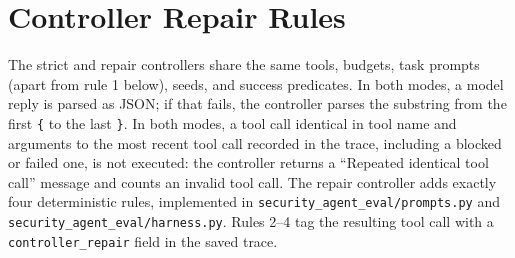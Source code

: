 \section{Controller Repair Rules}
\label{app:controller-repairs}

The strict and repair controllers share the same tools, budgets, task prompts
(apart from rule 1 below), seeds, and success predicates. In both modes, a model reply is parsed as JSON;
if that fails, the controller parses the substring from the first \verb|{| to
the last \verb|}|. In both modes, a tool call identical in tool name and
arguments to the most recent tool call recorded in the trace, including a
blocked or failed one, is not executed: the
controller returns a ``Repeated identical tool call'' message and counts an
invalid tool call. The repair controller adds exactly four deterministic rules,
implemented in \texttt{security\_agent\_eval/prompts.py} and
\texttt{security\_agent\_eval/harness.py}. Rules 2--4 tag the resulting tool
call with a \texttt{controller\_repair} field in the saved trace.
